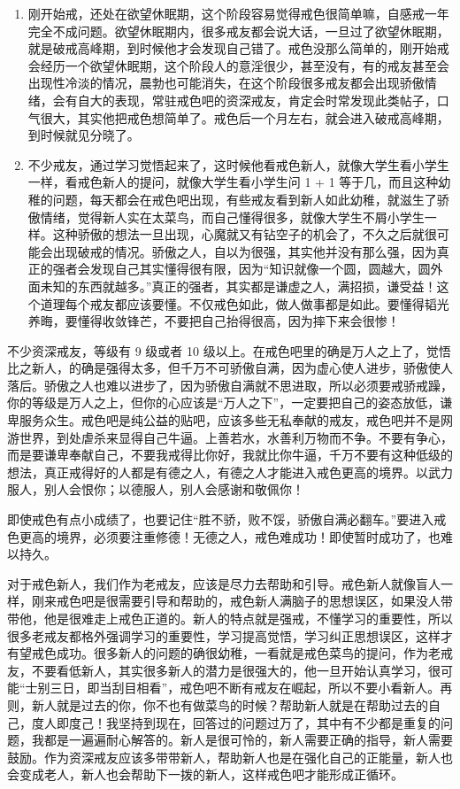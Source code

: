 \documentclass{ctexart}
\begin{document}
\begin{enumerate}
    \item 刚开始戒，还处在欲望休眠期，这个阶段容易觉得戒色很简单嘛，自感戒一年完全不成问题。欲望休眠期内，很多戒友都会说大话，一旦过了欲望休眠期，就是破戒高峰期，到时候他才会发现自己错了。戒色没那么简单的，刚开始戒会经历一个欲望休眠期，这个阶段人的意淫很少，甚至没有，有的戒友甚至会出现性冷淡的情况，晨勃也可能消失，在这个阶段很多戒友都会出现骄傲情绪，会有自大的表现，常驻戒色吧的资深戒友，肯定会时常发现此类帖子，口气很大，其实他把戒色想简单了。戒色后一个月左右，就会进入破戒高峰期，到时候就见分晓了。
    \item 不少戒友，通过学习觉悟起来了，这时候他看戒色新人，就像大学生看小学生一样，看戒色新人的提问，就像大学生看小学生问 1 + 1 等于几，而且这种幼稚的问题，每天都会在戒色吧出现，有些戒友看到新人如此幼稚，就滋生了骄傲情绪，觉得新人实在太菜鸟，而自己懂得很多，就像大学生不屑小学生一样。这种骄傲的想法一旦出现，心魔就又有钻空子的机会了，不久之后就很可能会出现破戒的情况。骄傲之人，自以为很强，其实他并没有那么强，因为真正的强者会发现自己其实懂得很有限，因为“知识就像一个圆，圆越大，圆外面未知的东西就越多。”真正的强者，其实都是谦虚之人，满招损，谦受益！这个道理每个戒友都应该要懂。不仅戒色如此，做人做事都是如此。要懂得韬光养晦，要懂得收敛锋芒，不要把自己抬得很高，因为摔下来会很惨！
\end{enumerate}

不少资深戒友，等级有 9 级或者 10 级以上。在戒色吧里的确是万人之上了，觉悟比之新人，的确是强得太多，但千万不可骄傲自满，因为虚心使人进步，骄傲使人落后。骄傲之人也难以进步了，因为骄傲自满就不思进取，所以必须要戒骄戒躁，你的等级是万人之上，但你的心应该是“万人之下”，一定要把自己的姿态放低，谦卑服务众生。戒色吧是纯公益的贴吧，应该多些无私奉献的戒友，戒色吧并不是网游世界，到处虐杀来显得自己牛逼。上善若水，水善利万物而不争。不要有争心，而是要谦卑奉献自己，不要我戒得比你好，我就比你牛逼，千万不要有这种低级的想法，真正戒得好的人都是有德之人，有德之人才能进入戒色更高的境界。以武力服人，别人会恨你；以德服人，别人会感谢和敬佩你！

即使戒色有点小成绩了，也要记住“胜不骄，败不馁，骄傲自满必翻车。”要进入戒色更高的境界，必须要注重修德！无德之人，戒色难成功！即使暂时成功了，也难以持久。

对于戒色新人，我们作为老戒友，应该是尽力去帮助和引导。戒色新人就像盲人一样，刚来戒色吧是很需要引导和帮助的，戒色新人满脑子的思想误区，如果没人带带他，他是很难走上戒色正道的。新人的特点就是强戒，不懂学习的重要性，所以很多老戒友都格外强调学习的重要性，学习提高觉悟，学习纠正思想误区，这样才有望戒色成功。很多新人的问题的确很幼稚，一看就是戒色菜鸟的提问，作为老戒友，不要看低新人，其实很多新人的潜力是很强大的，他一旦开始认真学习，很可能“士别三日，即当刮目相看”，戒色吧不断有戒友在崛起，所以不要小看新人。再则，新人就是过去的你，你不也有做菜鸟的时候？帮助新人就是在帮助过去的自己，度人即度己！我坚持到现在，回答过的问题过万了，其中有不少都是重复的问题，我都是一遍遍耐心解答的。新人是很可怜的，新人需要正确的指导，新人需要鼓励。作为资深戒友应该多带带新人，帮助新人也是在强化自己的正能量，新人也会变成老人，新人也会帮助下一拨的新人，这样戒色吧才能形成正循环。
\end{document}
